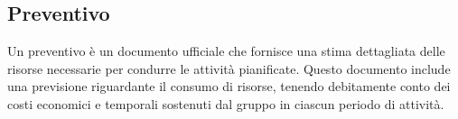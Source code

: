 \subsection{Preventivo}
    Un preventivo è un documento ufficiale che fornisce una stima dettagliata delle risorse necessarie per condurre le attività pianificate. Questo documento include una previsione riguardante il consumo di risorse, tenendo debitamente conto dei costi economici e temporali sostenuti dal gruppo in ciascun periodo di attività.